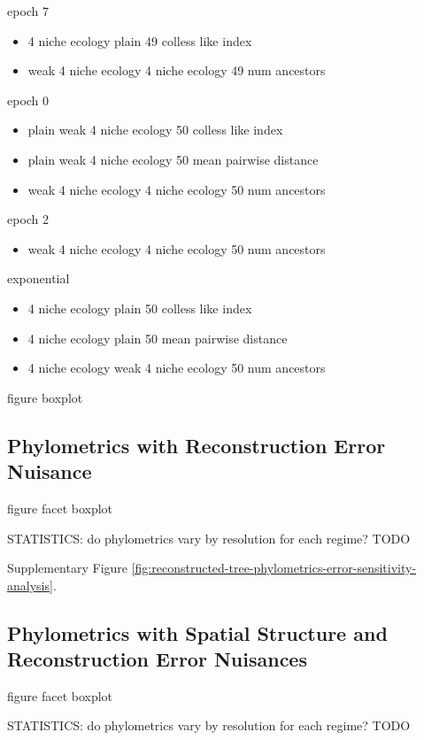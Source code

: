 epoch 7
\begin{itemize}
    \item 4 niche ecology	plain	49	colless like index
\item weak 4 niche ecology	4 niche ecology	49	num ancestors
\end{itemize}

epoch 0
\begin{itemize}

\item plain	weak 4 niche ecology	50	colless like index
\item plain	weak 4 niche ecology	50	mean pairwise distance
\item weak 4 niche ecology	4 niche ecology	50	num ancestors

\end{itemize}

epoch 2
\begin{itemize}
    \item weak 4 niche ecology	4 niche ecology	50	num ancestors
\end{itemize}

exponential
\begin{itemize}
    \item 4 niche ecology	plain	50	colless like index
    \item 4 niche ecology	plain	50	mean pairwise distance
    \item 4 niche ecology	weak 4 niche ecology	50	num ancestors
\end{itemize}

figure boxplot


\subsection{Phylometrics with Reconstruction Error Nuisance}



figure facet boxplot

STATISTICS: do phylometrics vary by resolution for each regime?
TODO



Supplementary Figure \ref{fig:reconstructed-tree-phylometrics-error-sensitivity-analysis}.

\subsection{Phylometrics with Spatial Structure and Reconstruction Error Nuisances}

figure facet boxplot


STATISTICS: do phylometrics vary by resolution for each regime?
TODO
